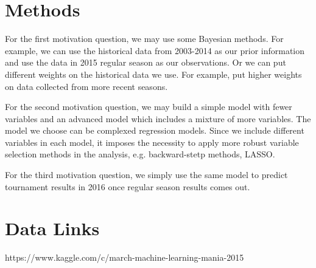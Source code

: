 \documentclass{article} %
\begin{document}


\section{Methods}
\label{gen_inst}

For the first motivation question, we may use some Bayesian methods. For example, we can use the historical data from 2003-2014 as our prior information and use the data in 2015 regular season as our observations. Or we can put different weights on the historical data we use. For example, put higher weights on data collected from more recent seasons.

For the second motivation question, we may build a simple model with fewer variables and an advanced model which includes a mixture of more variables. The model we choose can be complexed regression models. Since we include different variables in each model, it imposes the necessity to apply more robust variable selection methods in the analysis, e.g. backward-stetp methods, LASSO.    

For the third motivation question, we simply use the same model to predict tournament results in 2016 once regular season results comes out. 

\section{Data Links}
 https://www.kaggle.com/c/march-machine-learning-mania-2015\\
\end{document}
